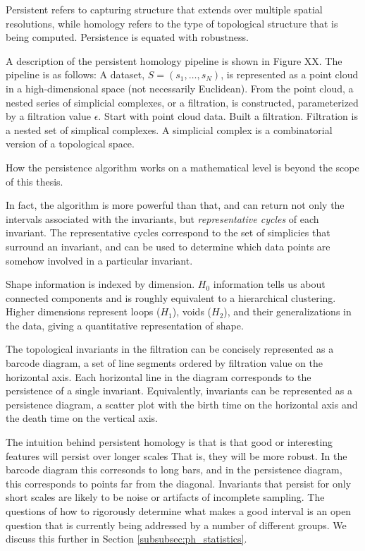 Persistent refers to capturing structure that extends over multiple spatial resolutions, while homology refers to the type of topological structure that is being computed.
Persistence is equated with robustness.

A description of the persistent homology pipeline is shown in Figure XX.
The pipeline is as follows:
A dataset, $S=(s_{1},\ldots,s_{N})$, is represented as a point cloud in a high-dimensional space (not necessarily Euclidean).
From the point cloud, a nested series of simplicial complexes, or a filtration, is constructed, parameterized by a filtration value $\epsilon$.
Start with point cloud data.
Built a filtration.
Filtration is a nested set of simplical complexes.
A simplicial complex is a combinatorial version of a topological space.

How the persistence algorithm works on a mathematical level is beyond the scope of this thesis.

In fact, the algorithm is more powerful than that, and can return not only the intervals associated with the invariants, but \emph{representative cycles} of each invariant.
The representative cycles correspond to the set of simplicies that surround an invariant, and can be used to determine which data points are somehow involved in a particular invariant.

Shape information is indexed by dimension. $H_0$ information tells us about connected components and is roughly equivalent to a hierarchical clustering.
Higher dimensions represent loops ($H_1$), voids ($H_2$), and their generalizations in the data, giving a quantitative representation of shape.

The topological invariants in the filtration can be concisely represented as a barcode diagram, a set of line segments ordered by filtration value on the horizontal axis.
Each horizontal line in the diagram corresponds to the persistence of a single invariant.
Equivalently, invariants can be represented as a persistence diagram, a scatter plot with the birth time on the horizontal axis and the death time on the vertical axis.
\kje{[Figure.]}

The intuition behind persistent homology is that is that good or interesting features will persist over longer scales
That is, they will be more robust.
In the barcode diagram this corresonds to long bars, and in the persistence diagram, this corresponds to points far from the diagonal.
Invariants that persist for only short scales are likely to be noise or artifacts of incomplete sampling.
The questions of how to rigorously determine what makes a good interval is an open question that is currently being addressed by a number of different groups.
We discuss this further in Section \ref{subsubsec:ph_statistics}.

